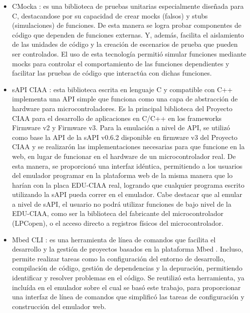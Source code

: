 \begin{itemize}
    \item CMocka \citep{CMocka}: es una biblioteca de pruebas unitarias especialmente diseñada para C, destacandose por su capacidad de crear mocks (falsos) y stubs (simulaciones) de funciones. De esta manera se logra probar componentes de código que dependen de funciones externas. Y, además, facilita el aislamiento de las unidades de código y la creación de escenarios de prueba que pueden ser controlados. El uso de esta tecnología permitió simular funciones mediante mocks para controlar el comportamiento de las funciones dependientes y facilitar las pruebas de código que interactúa con dichas funciones.
    
	    \item sAPI CIAA \citep{sAPICIAA}: esta biblioteca escrita en lenguaje C y compatible con C++ implementa una API simple que funciona como una capa de abstracción de hardware para microcontroladores. Es la principal biblioteca del Proyecto CIAA para el desarrollo de aplicaciones en C/C++ en los frameworks Firmware v2\citep{firmwareV2} y Firmware v3\citep{firmwareV3}. 
Para la emulación a nivel de API, se utilizó como base la API de la sAPI v0.6.2 disponible en firmware v3 del Proyecto CIAA \citep{sAPIv0.6.2} y se realizarón las implementaciones necesarias para que funcione en la web, en lugar de funcionar en el hardware de un microcontrolador real.
De esta manera, se proporcionó una interfaz idéntica, permitiendo a los usuarios del emulador programar en la plataforma web de la misma manera que lo harían con la placa EDU-CIAA real, logrando que cualquier programa escrito utilizando la sAPI pueda correr en el emulador.
Cabe destacar que al emular a nivel de sAPI, el usuario no podrá utilizar funciones de bajo nivel de la EDU-CIAA, como ser la biblioteca del fabricante del microcontrolador (LPCopen\citep{lpcopen}), o el acceso directo a registros físicos del microcontrolador.
    
    \item Mbed CLI \citep{MbedCLI}: es una herramienta de línea de comandos que facilita el desarrollo y la gestión de proyectos basados en la plataforma Mbed \citep{ArmMbed}. Incluso, permite realizar tareas como la configuración del entorno de desarrollo, compilación de código, gestión de dependencias y la depuración, permitiendo identificar y resolver problemas en el código. Se reutilizó esta herramienta, ya incluída en el emulador sobre el cual se basó este trabajo, para proporcionar una interfaz de línea de comandos que simplificó las tareas de configuración y construcción del emulador web.
 

\end{itemize}
